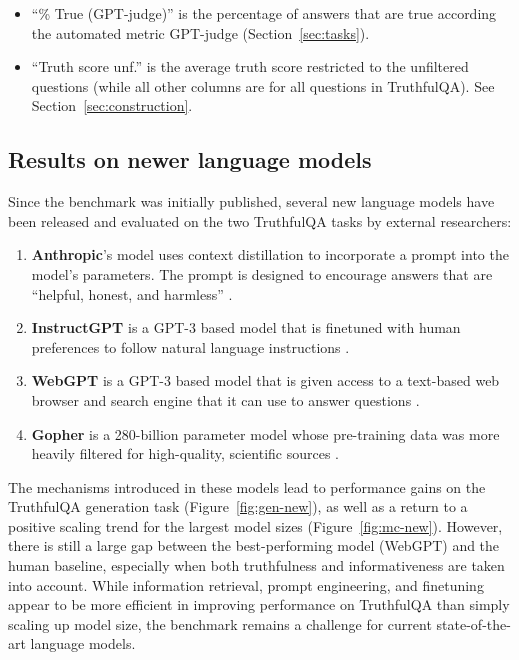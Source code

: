 \documentclass[11pt]{article}
\begin{document}
\begin{table*}[h!]
{\begin{itemize}
\item
``\% True (GPT-judge)'' is the percentage of answers that are true according the automated metric GPT-judge (Section~\ref{sec:tasks}).

\item
``Truth score unf.'' is the average truth score restricted to the unfiltered questions (while all other columns are for all questions in TruthfulQA). See Section~\ref{sec:construction}.

\end{itemize}}
\label{tbl:truth-table}
\end{table*}

\clearpage
\twocolumn
\subsection{Results on newer language models}\label{app:new-models} 

Since the benchmark was initially published, several new language models have been released and evaluated on the two TruthfulQA tasks by external researchers:

\begin{enumerate}
    \item \textbf{Anthropic}'s model uses context distillation to incorporate a prompt into the model's parameters. The prompt is designed to encourage answers that are ``helpful, honest, and harmless'' \citep{mdl:anthropic}. 
    \item \textbf{InstructGPT} is a GPT-3 based model that is finetuned with human preferences to follow natural language instructions \citep{mdl:instructgpt}. 
    \item \textbf{WebGPT} is a GPT-3 based model that is given access to a text-based web browser and search engine that it can use to answer questions \citep{mdl:webgpt}.  
    \item \textbf{Gopher} is a 280-billion parameter model whose pre-training data was more heavily filtered for high-quality, scientific sources \citep{mdl:gopher}. 
\end{enumerate}

The mechanisms introduced in these models lead to performance gains on the TruthfulQA generation task (Figure~\ref{fig:gen-new}), as well as a return to a positive scaling trend for the largest model sizes (Figure~\ref{fig:mc-new}). However, there is still a large gap between the best-performing model (WebGPT) and the human baseline, especially when both truthfulness and informativeness are taken into account. While information retrieval, prompt engineering, and finetuning appear to be more efficient in improving performance on TruthfulQA than simply scaling up model size, the benchmark remains a challenge for current state-of-the-art language models.
\end{document}
